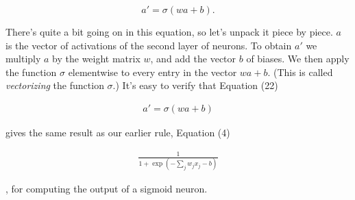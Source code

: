 \begin{equation}
a' = \sigma(w a + b).
\tag{22}
\end{equation}

\noindent There's quite a bit going on in this equation, so let's unpack it piece by piece. $a$ is the vector of activations of the second layer of neurons. To obtain $a'$ we multiply $a$ by the weight matrix $w$, and add the vector $b$ of biases. We then apply the function $\sigma$ elementwise to every entry in the vector $w a +b$. (This is called \emph{vectorizing} the function $\sigma$.) It's easy to verify that Equation (22)

\begin{align*}
a' = \sigma(w a + b) \nonumber
\end{align*}

\noindent gives the same result as our earlier rule, Equation (4)

\begin{align*}
\frac{1}{1+\exp(-\sum_j w_j x_j-b)} \nonumber
\end{align*}

\noindent, for computing the output of a sigmoid neuron.



